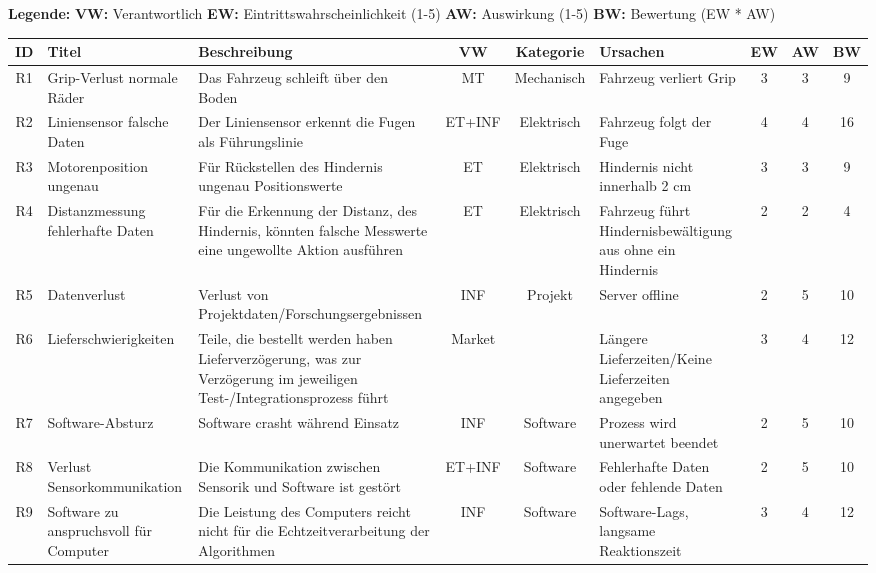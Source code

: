 \documentclass[../main.tex]{subfiles}
\begin{document}
\begin{landscape}
\newpage
\scriptsize

\textbf{Legende:}
\hspace{1cm}
\textbf{VW:} Verantwortlich
\hspace{1cm}
\textbf{EW:} Eintrittswahrscheinlichkeit (1-5)
\hspace{1cm}
\textbf{AW:} Auswirkung (1-5)
\hspace{1cm}
\textbf{BW:} Bewertung (EW * AW)

\begin{longtable}{|c|p{4cm}|p{6cm}|c|c|p{4cm}|c|c|c|}
\hline
\textbf{ID}  & \textbf{Titel} & \textbf{Beschreibung} & \textbf{VW} & \textbf{Kategorie} & \textbf{Ursachen} & \textbf{EW} & \textbf{AW} & \textbf{BW} \\ \hline
R1  & Grip-Verlust normale Räder & Das Fahrzeug schleift über den Boden & MT & Mechanisch & Fahrzeug verliert Grip & 3 & 3 & 9 \\ \hline
R2  & Liniensensor falsche Daten & Der Liniensensor erkennt die Fugen als Führungslinie & ET+INF & Elektrisch & Fahrzeug folgt der Fuge & 4 & 4 & 16 \\ \hline
R3  & Motorenposition ungenau & Für Rückstellen des Hindernis ungenau Positionswerte & ET & Elektrisch & Hindernis nicht innerhalb 2 cm & 3 & 3 & 9 \\ \hline
R4  & Distanzmessung fehlerhafte Daten & Für die Erkennung der Distanz, des Hindernis, könnten falsche Messwerte eine ungewollte Aktion ausführen & ET & Elektrisch & Fahrzeug führt Hindernisbewältigung aus ohne ein Hindernis & 2 & 2 & 4 \\ \hline
R5  & Datenverlust & Verlust von Projektdaten/Forschungsergebnissen & INF & Projekt & Server offline & 2 & 5 & 10 \\ \hline
R6  & Lieferschwierigkeiten & Teile, die bestellt werden haben Lieferverzögerung, was zur Verzögerung im jeweiligen Test-/Integrationsprozess führt & Market & & Längere Lieferzeiten/Keine Lieferzeiten angegeben & 3 & 4 & 12 \\ \hline
R7  & Software-Absturz & Software crasht während Einsatz & INF & Software & Prozess wird unerwartet beendet & 2 & 5 & 10 \\ \hline
R8  & Verlust Sensorkommunikation & Die Kommunikation zwischen Sensorik und Software ist gestört & ET+INF & Software & Fehlerhafte Daten oder fehlende Daten & 2 & 5 & 10 \\ \hline
R9  & Software zu anspruchsvoll für Computer & Die Leistung des Computers reicht nicht für die Echtzeitverarbeitung der Algorithmen & INF & Software & Software-Lags, langsame Reaktionszeit & 3 & 4 & 12 \\ \hline

\end{longtable}
\end{landscape}
\end{document}
